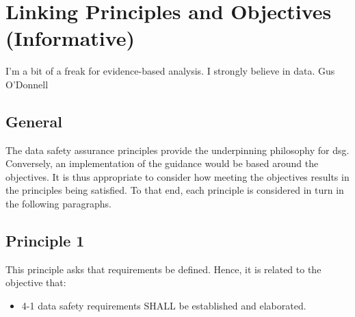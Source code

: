 %
%
\section{Linking Principles and Objectives (Informative)} \label{bkm:principlesobjectives}

\dsiwgSectionQuote
  {I'm a bit of a freak for evidence-based analysis. I strongly believe in data.}
  {Gus O'Donnell}


\subsection{General}

The data safety assurance principles provide the underpinning philosophy for \gls{dsg}. Conversely, an implementation of the guidance would be based around the objectives. It is thus appropriate to consider how meeting the objectives results in the principles being satisfied. To that end, each principle is considered in turn in the following paragraphs.


\subsection{Principle 1}

This principle asks that requirements be defined. Hence, it is related to the objective that:

\begin{itemize}
	\item \textcolor{dsiwgAccentColour}{4-1} \Glspl{data safety requirement} SHALL be established and elaborated.
\end{itemize}

